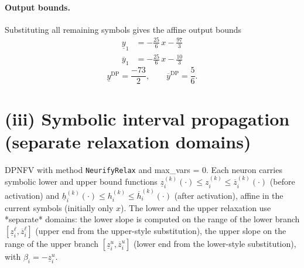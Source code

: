 \documentclass[11pt]{article}
\begin{document}
\paragraph{Output bounds.}
Substituting all remaining symbols gives the affine output bounds
\begin{align*}
\underline{y}_{1} &= -\frac{25}{6}\,x - \frac{97}{3}
\end{align*}
\begin{align*}
\overline{y}_{1} &= -\frac{25}{6}\,x - \frac{10}{3}
\end{align*}
\begin{equation*}
\underline{y}^{\text{DP}} = \frac{-73}{2}, \qquad \overline{y}^{\text{DP}} = \frac{5}{6}.
\end{equation*}

\section{(iii) Symbolic interval propagation (separate relaxation domains)}
DPNFV with method \texttt{NeurifyRelax} and max\_vars = 0. Each neuron carries symbolic lower and upper bound functions
$\underline{z}^{(k)}_i(\cdot) \le z^{(k)}_i \le \overline{z}^{(k)}_i(\cdot)$ (before activation)
and $\underline{h}^{(k)}_i(\cdot) \le h^{(k)}_i \le \overline{h}^{(k)}_i(\cdot)$ (after activation),
affine in the current symbols (initially only $x$).
The lower and the upper relaxation use *separate* domains:
the lower slope is computed on the range of the lower branch
$[\underline{z}^{\ell}_i, \overline{z}^{\ell}_i]$ (upper end from the upper-style substitution),
the upper slope on the range of the upper branch
$[\underline{z}^{u}_i, \overline{z}^{u}_i]$ (lower end from the lower-style substitution),
with $\beta_i = -\underline{z}^{u}_i$.
\end{document}
